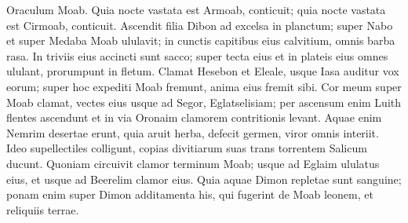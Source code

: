 \begin{biblechapter}
\begin{biblechapter}
\begin{biblechapter}
\begin{biblechapter}
\begin{biblechapter}
\begin{biblechapter}
\begin{biblechapter}
\begin{biblechapter}
\begin{biblechapter}
\begin{biblechapter}
\begin{biblechapter}
\begin{biblechapter}
\begin{biblechapter}
\begin{biblechapter}
\begin{biblechapter}
\verse Oraculum Moab.
 Quia nocte vastata est Armoab, conticuit;
 quia nocte vastata est Cirmoab, conticuit.
 \verse Ascendit filia Dibon ad excelsa in planctum;
 super Nabo et super Medaba Moab ululavit;
 in cunctis capitibus eius calvitium, omnis barba rasa.
 \verse In triviis eius accincti sunt sacco;
 super tecta eius et in plateis eius
 omnes ululant, prorumpunt in fletum.
 \verse Clamat Hesebon et Eleale,
 usque Iasa auditur vox eorum;
 super hoc expediti Moab fremunt,
 anima eius fremit sibi.
 \verse Cor meum super Moab clamat,
 vectes eius usque ad Segor, Eglatselisiam;
 per ascensum enim Luith flentes ascendunt
 et in via Oronaim clamorem contritionis levant.
 \verse Aquae enim Nemrim desertae erunt,
 quia aruit herba, defecit germen,
 viror omnis interiit.
 \verse Ideo supellectiles colligunt, copias divitiarum suas
 trans torrentem Salicum ducunt.
 \verse Quoniam circuivit clamor terminum Moab;
 usque ad Eglaim ululatus eius,
 et usque ad Beerelim clamor eius.
 \verse Quia aquae Dimon repletae sunt sanguine;
 ponam enim super Dimon additamenta
 his, qui fugerint de Moab leonem, et reliquiis terrae.
 

\end{biblechapter}
\end{biblechapter}
\end{biblechapter}
\end{biblechapter}
\end{biblechapter}
\end{biblechapter}
\end{biblechapter}
\end{biblechapter}
\end{biblechapter}
\end{biblechapter}
\end{biblechapter}
\end{biblechapter}
\end{biblechapter}
\end{biblechapter}
\end{biblechapter}
